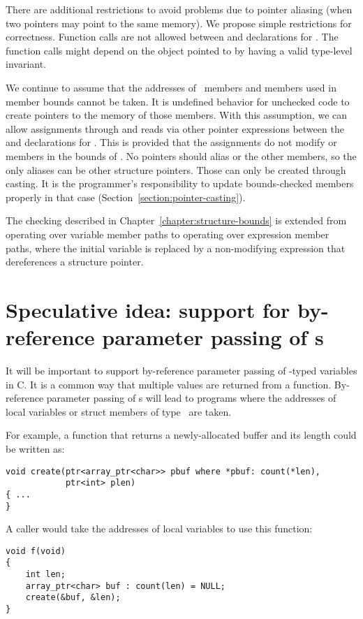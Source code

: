 There are additional restrictions to avoid problems due to pointer aliasing 
(when two pointers may point to the same memory).   We propose simple restrictions
for correctness.
Function calls are not allowed between  and 
 declarations for \code{->}.  The function calls 
might depend on the object pointed to by  having a  valid type-level invariant.
  
We continue to assume that the addresses of \arrayptr\ members and members
used in member bounds cannot be taken.  It is undefined behavior for unchecked
code to create pointers to the memory of those members.   With this assumption, we 
can allow assignments through and reads via other pointer expressions
between the  and  declarations for
\code{->}.  This is provided that the assignments do not modify 
 or members in the bounds of .  No pointers should alias
 or the other members, so the only aliases can be other structure
pointers.  Those can only be created through casting.  It is the programmer's responsibility
to update bounds-checked members properly in that case (Section~\ref{section:pointer-casting}).

The checking described in Chapter~\ref{chapter:structure-bounds} is extended from
operating over variable member paths to operating over expression member paths, where
the initial variable is replaced by a non-modifying expression that dereferences a structure
pointer.

\section{Speculative idea: support for by-reference parameter passing of \protect\arrayptr s}

It will be important to support by-reference parameter passing of \arrayptr-typed variables
in C.  It is a common way that multiple values are returned from a function.  By-reference parameter
passing of \arrayptr s will lead to programs where the addresses of local variables or struct
members of type \arrayptr\ are taken.

For example, a function that returns a newly-allocated buffer and its length could be written as:
\begin{lstlisting}
void create(ptr<array_ptr<char>> pbuf where *pbuf: count(*len),
            ptr<int> plen)
{ ...
}
\end{lstlisting}
A caller would take the addresses of local variables to use this function:
\begin{lstlisting}
void f(void)
{
    int len;
    array_ptr<char> buf : count(len) = NULL;
    create(&buf, &len);
}
\end{lstlisting}

